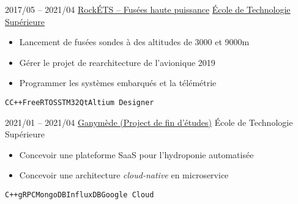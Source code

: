 \documentclass[9pt]{developercv} %
\begin{document}
\begin{minipage}[t]{0.8\textwidth}


\begin{entrylist}
	\entry
		{2017/05 -- 2021/04}
		{\href{https://clubrockets.ca/}{RockÉTS -- Fusées haute puissance}}
		{\href{https://clubrockets.ca/}{École de Technologie Supérieure}}
		{
			\vspace{-14pt}
			\begin{itemize}
				\renewcommand{\labelitemi}{\raisebox{.45ex}{\rule{.6ex}{.6ex}}}
				\setlength\itemsep{-1pt}
				\item Lancement de fusées sondes à des altitudes de 3000 et 9000m
				\item Gérer le projet de rearchitecture de l'avionique 2019
				\item Programmer les systèmes embarqués et la télémétrie
			\end{itemize}
			\vspace{-4pt}
			\texttt{C}\slashsep\texttt{C++}\slashsep\texttt{FreeRTOS}\slashsep\texttt{STM32}\slashsep\texttt{Qt}\slashsep\texttt{Altium Designer}
		}
	\entry
		{2021/01 -- 2021/04}
		{\href{https://github.com/ngc7293/ganymede}{Ganymède (Project de fin d'études)}}
		{École de Technologie Supérieure}
		{
			\vspace{-14pt}
			\begin{itemize}
				\renewcommand{\labelitemi}{\raisebox{.45ex}{\rule{.6ex}{.6ex}}}
				\setlength\itemsep{-1pt}
				\item Concevoir une plateforme SaaS pour l'hydroponie automatisée
				\item Concevoir une architecture \emph{cloud-native} en microservice
			\end{itemize}
			\vspace{-4pt}
			\texttt{C++}\slashsep\texttt{gRPC}\slashsep\texttt{MongoDB}\slashsep\texttt{InfluxDB}\slashsep\texttt{Google Cloud}
		}
\end{entrylist}



\end{minipage}
\end{document}
